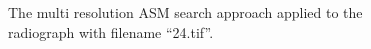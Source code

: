 \documentclass[a4paper]{article}
\begin{document}
\begin{figure}[!tbp]
  \centering
  \begin{adjustbox}{center}
  \end{adjustbox}
  \caption{The multi resolution ASM search approach applied to the radiograph with filename ``24.tif''.}
  \label{fig:multi-resolution-search-example}
\end{figure}
\end{document}

